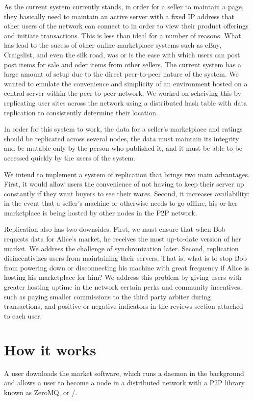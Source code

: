 \documentclass[12pt,twocolumn]{article}
\begin{document}
As the current system currently stands, in order for a seller to maintain a page, they basically need to maintain an active server with a fixed IP address that other users of the network can connect to in order to view their product offerings and initiate transactions. This is less than ideal for a number of reasons. What has lead to the sucess of other online marketplace systems such as eBay, Craigslist, and even the silk road, was or is the ease with which users can post post items for sale and oder items from other sellers. The current system has a large amount of setup due to the direct peer-to-peer nature of the system. We wanted to emulate the convenience and simplicity of an environment hosted on a central server within the peer to peer network. We worked on scheiving this by replicating user sites across the network using a distributed hash table with data replication to consistently determine their location.

In order for this system to work, the data for a seller's marketplace and ratings should be replicated across several nodes, the data must maintain its integrity and be mutable only by the person who published it, and it must be able to be accessed quickly by the users of the system.

We intend to implement a system of replication that brings two main advantages.
First, it would allow users the convenience of not having to keep their server up constantly if they want buyers to see their wares.
Second, it increases availability: in the event that a seller's machine or otherwise needs to go offline, his or her marketplace is being hosted by other nodes in the P2P network.

Replication also has two downsides.
First, we must ensure that when Bob requests data for Alice's market, he receives the most up-to-date version of her market. We address the challenge of synchronization later.
Second, replication disincentivizes users from maintaining their servers. That is, what is to stop Bob from powering down or disconnecting his machine with great frequency if Alice is hosting his marketplace for him? We address this problem by giving users with greater hosting uptime in the network certain perks and community incentives, such as paying smaller commissions to the third party arbiter during transactions, and positive or negative indicators in the reviews section attached to each user.

\section{How it works}
A user downloads the market software, which runs a daemon in the background and allows a user to become a node in a distributed network with a P2P library known as ZeroMQ, or \ZMQ/. 
\end{document}
